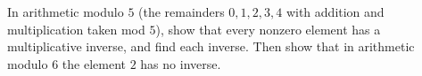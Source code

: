 In arithmetic modulo $5$ (the remainders $0,1,2,3,4$ with addition and multiplication taken mod $5$), show that every nonzero element has a multiplicative inverse, and find each inverse. Then show that in arithmetic modulo $6$ the element $2$ has no inverse.
